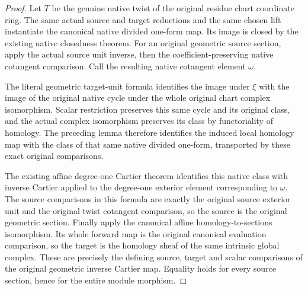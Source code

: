 \begin{proof}
Let $T$ be the genuine native twist of the original residue chart
coordinate ring. The same actual source and target reductions and the
same chosen lift instantiate the canonical native divided one-form
map. Its image is closed by the existing native closedness theorem.
For an original geometric source section, apply the actual source unit
inverse, then the coefficient-preserving native cotangent comparison.
Call the resulting native cotangent element $\omega$.

The literal geometric target-unit formula identifies the image under
$\xi$ with the image of the original native cycle under the whole
original chart complex isomorphism. Scalar restriction preserves this
same cycle and its original class, and the actual complex isomorphism
preserves its class by functoriality of homology. The preceding lemma
therefore identifies the induced local homology map with the class of
that same native divided one-form, transported by these exact original
comparisons.

The existing affine degree-one Cartier theorem identifies this native
class with inverse Cartier applied to the degree-one exterior element
corresponding to $\omega$. The source comparisons in this formula are
exactly the original source exterior unit and the original twist
cotangent comparison, so the source is the original geometric section.
Finally apply the canonical affine homology-to-sections isomorphism.
Its whole forward map is the original canonical evaluation comparison,
so the target is the homology sheaf of the same intrinsic global
complex. These are precisely the defining source, target and scalar
comparisons of the original geometric inverse Cartier map. Equality
holds for every source section, hence for the entire module morphism.
\end{proof}

